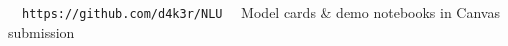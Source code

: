 \documentclass[final,t]{beamer}
\begin{document}
\begin{frame}[t]
\vspace{-0.2cm}
\begin{center}
{\small
\faGithub\ \ \texttt{https://github.com/d4k3r/NLU} \quad
\faFile\ \ Model cards \& demo notebooks in Canvas submission
}
\end{center}

\end{frame}
\end{document}
